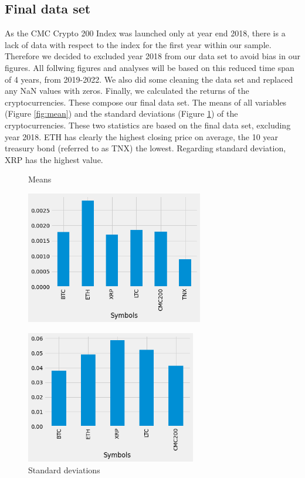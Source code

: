 \subsection{Final data set}
As the CMC Crypto 200 Index was launched only at year end 2018, there is a lack of data with respect to the index for the first year within our sample. Therefore we decided to excluded year 2018 from our data set to avoid bias in our figures. All follwing figures and analyses will be based on this reduced time span of 4 years, from 2019-2022. We also did some cleaning the data set and replaced any NaN values with zeros.
Finally, we calculated the returns of the cryptocurrencies. These compose our final data set. The means of all variables (Figure \ref{fig:mean}) and the standard deviations (Figure \ref{fig:std}) of the cryptocurrencies. These two statistics are based on the final data set, excluding year 2018. ETH has clearly the highest closing price on average, the 10 year treasury bond (referred to as TNX) the lowest. Regarding standard deviation, XRP has the highest value.


\begin{figure}
\centering
\begin{minipage}{.5\textwidth}
  \centering
  \caption{Means}
  \label{fig:mean}
  \includegraphics[height=5.8cm,keepaspectratio]{images/mean.png}
\end{minipage}%
\begin{minipage}{.5\textwidth}
  \centering
  \caption{Standard deviations}
  \label{fig:std}
  \includegraphics[height=5.8cm,keepaspectratio]{images/std.png}
\end{minipage}
\end{figure}

